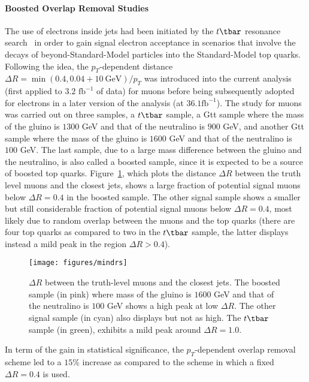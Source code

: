 \paragraph{Boosted Overlap Removal Studies} The use of electrons inside jets
had been initiated by the $t\tbar$ resonance search~\cite{ttbarres} in order to
gain signal electron acceptance in scenarios that involve the decays of
beyond-Standard-Model particles into the Standard-Model top quarks. Following
the idea, the $p_T$-dependent distance $\Delta R = \min(0.4,
0.04+10~\text{GeV}) / p_T$ was introduced into the current analysis (first
applied to $3.2\text{ fb}^{-1}$ of data) for muons before being subsequently
adopted for electrons in a later version of the analysis (at $36.1\text{
fb}^{-1}$). The study for muons was carried out on three samples, a $t\tbar$
sample, a Gtt sample where the mass of the gluino is $1300$ GeV and that of the
neutralino is $900$ GeV, and another Gtt sample where the mass of the gluino is
$1600$ GeV and that of the neutralino is $100$ GeV. The last sample, due to a
large mass difference between the gluino and the neutralino, is also called a
boosted sample, since it is expected to be a source of boosted top quarks.
Figure~\ref{f:mindrs}, which plots the distance $\Delta R$ between the truth
level muons and the closest jets, shows a large fraction of potential signal
muons below $\Delta R = 0.4$ in the boosted sample. The other signal sample
shows a smaller but still considerable fraction of potential signal muons below
$\Delta R = 0.4$, most likely due to random overlap between the muons and the
top quarks (there are four top quarks as compared to two in the $t\tbar$
sample, the latter displays instead a mild peak in the region $\Delta R >
0.4$).

\begin{figure}[H]
	\texttt{[image: figures/mindrs]}
	\centering

	\caption{$\Delta R$ between the truth-level muons and the closest jets. The
		boosted sample (in pink) where mass of the gluino is $1600$ GeV and that of the
		neutralino is $100$ GeV shows a high peak at low $\Delta R$. The other signal
		sample (in cyan) also displays but not as high. The $t\tbar$ sample (in green),
		exhibits a mild peak around $\Delta R = 1.0$.}

	\label{f:mindrs}
\end{figure}

In term of the gain in statistical significance, the $p_T$-dependent overlap 
removal scheme led to a $15\%$ increase as compared to the scheme in which 
a fixed $\Delta R = 0.4$ is used. 

